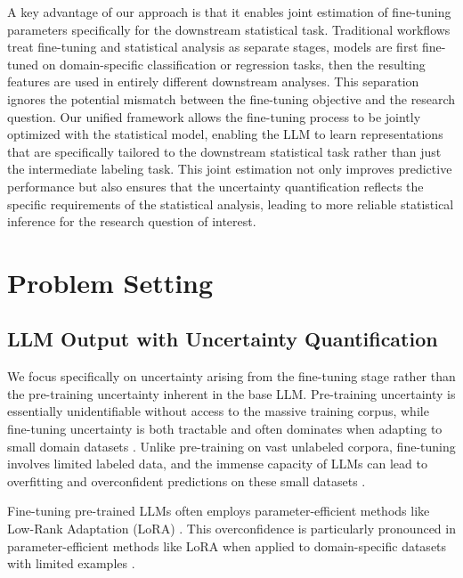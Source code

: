 \documentclass[11pt]{article}
\begin{document}
A key advantage of our approach is that it enables joint estimation of fine-tuning parameters specifically for the downstream statistical task. Traditional workflows treat fine-tuning and statistical analysis as separate stages, models are first fine-tuned on domain-specific classification or regression tasks, then the resulting features are used in entirely different downstream analyses. This separation ignores the potential mismatch between the fine-tuning objective and the research question. Our unified framework allows the fine-tuning process to be jointly optimized with the statistical model, enabling the LLM to learn representations that are specifically tailored to the downstream statistical task rather than just the intermediate labeling task. This joint estimation not only improves predictive performance but also ensures that the uncertainty quantification reflects the specific requirements of the statistical analysis, leading to more reliable statistical inference for the research question of interest.

\section{Problem Setting}

\subsection{LLM Output with Uncertainty Quantification}

We focus specifically on uncertainty arising from the fine-tuning stage rather than the pre-training uncertainty inherent in the base LLM.
Pre-training uncertainty is essentially unidentifiable without access to the massive training corpus,
while fine-tuning uncertainty is both tractable and often dominates when adapting to small domain datasets
\citep{kong2020calibrating, yang2023bayesian, xiong2024llms}. 
Unlike pre-training on vast unlabeled corpora, fine-tuning involves limited labeled data, 
and the immense capacity of LLMs can lead to overfitting and overconfident predictions on these small datasets \citep{kong2020calibrating, lin2022teaching}. 

Fine-tuning pre-trained LLMs often employs parameter-efficient methods like Low-Rank Adaptation (LoRA) \citep{hu2022lora}. 
This overconfidence is particularly pronounced in parameter-efficient methods like LoRA 
when applied to domain-specific datasets with limited examples \citep{yang2023bayesian, wang2024blob}.
\end{document}
